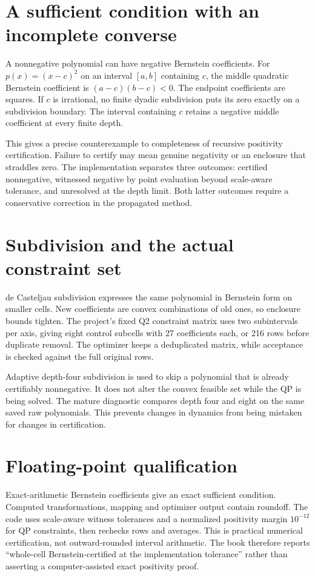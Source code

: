 \section{A sufficient condition with an incomplete converse}
A nonnegative polynomial can have negative Bernstein coefficients. For $p(x)=(x-c)^2$ on an interval $[a,b]$ containing $c$, the middle quadratic Bernstein coefficient is $(a-c)(b-c)<0$. The endpoint coefficients are squares. If $c$ is irrational, no finite dyadic subdivision puts its zero exactly on a subdivision boundary. The interval containing $c$ retains a negative middle coefficient at every finite depth.

This gives a precise counterexample to completeness of recursive positivity certification. Failure to certify may mean genuine negativity or an enclosure that straddles zero. The implementation separates three outcomes: certified nonnegative, witnessed negative by point evaluation beyond scale-aware tolerance, and unresolved at the depth limit. Both latter outcomes require a conservative correction in the propagated method.

\section{Subdivision and the actual constraint set}
de Casteljau subdivision expresses the same polynomial in Bernstein form on smaller cells. New coefficients are convex combinations of old ones, so enclosure bounds tighten. The project's fixed Q2 constraint matrix uses two subintervals per axis, giving eight control subcells with 27 coefficients each, or 216 rows before duplicate removal. The optimizer keeps a deduplicated matrix, while acceptance is checked against the full original rows.

Adaptive depth-four subdivision is used to skip a polynomial that is already certifiably nonnegative. It does not alter the convex feasible set while the QP is being solved. The mature diagnostic compares depth four and eight on the same saved raw polynomials. This prevents changes in dynamics from being mistaken for changes in certification.

\section{Floating-point qualification}
Exact-arithmetic Bernstein coefficients give an exact sufficient condition. Computed transformations, mapping and optimizer output contain roundoff. The code uses scale-aware witness tolerances and a normalized positivity margin $10^{-12}$ for QP constraints, then rechecks rows and averages. This is practical numerical certification, not outward-rounded interval arithmetic. The book therefore reports ``whole-cell Bernstein-certified at the implementation tolerance'' rather than asserting a computer-assisted exact positivity proof.

